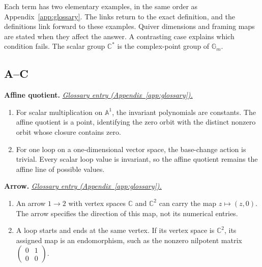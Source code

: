 \documentclass[11pt,a4paper]{article}
\numberwithin{equation}{section}
\theoremstyle{definition}
\newcommand{\A}{\mathbb A}
\newcommand{\Gm}{\mathbb G_m}
\begin{document}
Each term has two elementary examples, in the same order as
Appendix~\ref{app:glossary}. The links return to the exact definition,
and the definitions link forward to these examples. Quiver dimensions
and framing maps are stated when they affect the answer. A contrasting
case explains which condition fails. The scalar group $\mathbb C^*$
is the complex-point group of $\Gm$.

\newcommand{\examplegloss}[3]{%
  \par\medskip\Needspace{5\baselineskip}\phantomsection\label{examples:#1}%
  \noindent\textbf{#2.}\quad
  \hyperref[gloss:#1]{\textit{Glossary entry (Appendix~\ref*{app:glossary}).}}\par
  #3\par}

\subsection*{A--C}

\examplegloss{affine-quotient}{Affine quotient}{
\begin{enumerate}[label=(\arabic*),leftmargin=*,itemsep=2pt,topsep=3pt]
\item For scalar multiplication on $\A^1$, the invariant polynomials are constants. The affine quotient is a point, identifying the zero orbit with the distinct nonzero orbit whose closure contains zero.
\item For one loop on a one-dimensional vector space, the base-change action is trivial. Every scalar loop value is invariant, so the affine quotient remains the affine line of possible values.
\end{enumerate}}

\examplegloss{arrow}{Arrow}{
\begin{enumerate}[label=(\arabic*),leftmargin=*,itemsep=2pt,topsep=3pt]
\item An arrow $1\to2$ with vertex spaces $\mathbb C$ and $\mathbb C^2$ can carry the map $z\mapsto(z,0)$. The arrow specifies the direction of this map, not its numerical entries.
\item A loop starts and ends at the same vertex. If its vertex space is $\mathbb C^2$, its assigned map is an endomorphism, such as the nonzero nilpotent matrix $\left(\begin{smallmatrix}0&1\\0&0\end{smallmatrix}\right)$.
\end{enumerate}}
\end{document}
